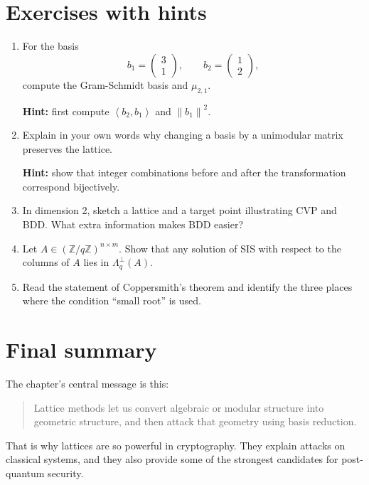 \documentclass[11pt]{article}
\newcommand{\Z}{\mathbb{Z}}
\newcommand{\norm}[1]{\left\lVert #1 \right\rVert}
\newcommand{\ip}[2]{\left\langle #1,#2 \right\rangle}
\begin{document}
\section{Exercises with hints}

\begin{enumerate}
    \item For the basis
    \[
    b_1=\begin{pmatrix}3\\1\end{pmatrix},\qquad b_2=\begin{pmatrix}1\\2\end{pmatrix},
    \]
    compute the Gram-Schmidt basis and $\mu_{2,1}$.
    
    \textbf{Hint:} first compute $\ip{b_2}{b_1}$ and $\norm{b_1}^2$.

    \item Explain in your own words why changing a basis by a unimodular matrix preserves the lattice.
    
    \textbf{Hint:} show that integer combinations before and after the transformation correspond bijectively.

    \item In dimension 2, sketch a lattice and a target point illustrating CVP and BDD. What extra information makes BDD easier?

    \item Let $A\in (\Z/q\Z)^{n\times m}$. Show that any solution of SIS with respect to the columns of $A$ lies in $\Lambda_q^{\perp}(A)$.

    \item Read the statement of Coppersmith's theorem and identify the three places where the condition ``small root'' is used.
\end{enumerate}

\section{Final summary}

The chapter's central message is this:
\begin{quote}
Lattice methods let us convert algebraic or modular structure into geometric structure, and then attack that geometry using basis reduction.
\end{quote}

That is why lattices are so powerful in cryptography. They explain attacks on classical systems, and they also provide some of the strongest candidates for post-quantum security.
\end{document}
